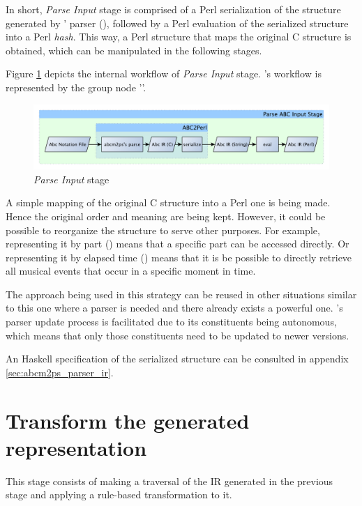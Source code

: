 In short, \emph{Parse \abc{} Input} stage is comprised of a Perl serialization of the structure
generated by \abcmtops{}' parser (\abctoperl{}), followed by a Perl evaluation of the serialized
structure into a Perl \emph{hash}. This way, a Perl structure that maps the original C structure is
obtained, which can be manipulated in the following stages.

Figure \ref{fig:parse_abc_input_stage} depicts the internal workflow of \emph{Parse \abc{} Input}
stage. \abctoperl{}'s workflow is represented by the group node '\abctoperl{}'.

\begin{figure}[htb]
  \centering
  \includegraphics[width=\textwidth]{img/parse_abc_input_stage.pdf}
  \caption{\emph{Parse \abc{} Input} stage}
  \label{fig:parse_abc_input_stage}
\end{figure}

A simple mapping of the original C structure into a Perl one is being made. Hence the original order
and meaning are being kept. However, it could be possible to reorganize the structure to serve other
purposes. For example, representing it by part (\partwise{}) means that a specific part can be
accessed directly. Or representing it by elapsed time (\timewise{}) means that it is be possible to
directly retrieve all musical events that occur in a specific moment in time.

The approach being used in this strategy can be reused in other situations similar to this one where
a parser is needed and there already exists a powerful one. \abcdt{}'s parser update process is
facilitated due to its constituents being autonomous, which means that only those constituents need
to be updated to newer versions.

An Haskell specification of the serialized structure can be consulted in appendix
\ref{sec:abcm2ps_parser_ir}.

\section{Transform the generated representation}

This stage consists of making a traversal of the \ac{IR} generated in the previous stage and
applying a rule-based transformation to it.

